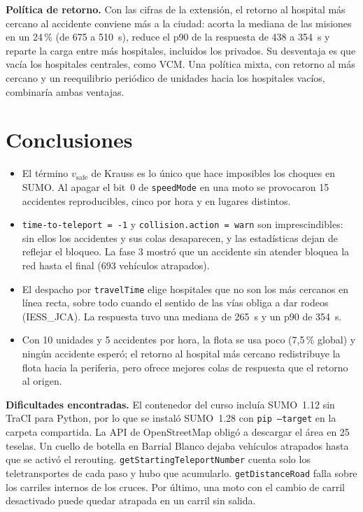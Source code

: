 \documentclass[conference,a4paper]{IEEEtran}
\begin{document}
\textbf{Política de retorno.} Con las cifras de la extensión, el retorno al hospital más
cercano al accidente conviene más a la ciudad: acorta la mediana de las misiones en un
24\,\% (de 675 a 510~s), reduce el p90 de la respuesta de 438 a 354~s y reparte la carga
entre más hospitales, incluidos los privados. Su desventaja es que vacía los hospitales
centrales, como VCM. Una política mixta, con retorno al más cercano y un reequilibrio
periódico de unidades hacia los hospitales vacíos, combinaría ambas ventajas.

\section{Conclusiones}
\begin{itemize}
\item El término $v_{\mathrm{safe}}$ de Krauss es lo único que hace imposibles los choques
en SUMO. Al apagar el bit~0 de \texttt{speedMode} en una moto se provocaron 15 accidentes
reproducibles, cinco por hora y en lugares distintos.
\item \texttt{time-to-teleport = -1} y \texttt{collision.action = warn} son
imprescindibles: sin ellos los accidentes y sus colas desaparecen, y las estadísticas
dejan de reflejar el bloqueo. La fase 3 mostró que un accidente sin atender bloquea la
red hasta el final (693 vehículos atrapados).
\item El despacho por \texttt{travelTime} elige hospitales que no son los más cercanos en
línea recta, sobre todo cuando el sentido de las vías obliga a dar rodeos (IESS\_JCA). La
respuesta tuvo una mediana de 265~s y un p90 de 354~s.
\item Con 10 unidades y 5 accidentes por hora, la flota se usa poco (7,5\,\% global) y
ningún accidente esperó; el retorno al hospital más cercano redistribuye la flota hacia la
periferia, pero ofrece mejores colas de respuesta que el retorno al origen.
\end{itemize}

\textbf{Dificultades encontradas.} El contenedor del curso incluía SUMO~1.12 sin TraCI
para Python, por lo que se instaló SUMO~1.28 con \texttt{pip --target} en la carpeta
compartida. La API de OpenStreetMap obligó a descargar el área en 25 teselas. Un cuello de
botella en Barrial Blanco dejaba vehículos atrapados hasta que se activó el rerouting.
\texttt{getStartingTeleportNumber} cuenta solo los teletransportes de cada paso y hubo que
acumularlo. \texttt{getDistanceRoad} falla sobre los carriles internos de los cruces.
Por último, una moto con el cambio de carril desactivado puede quedar atrapada en un carril
sin salida.
\end{document}
